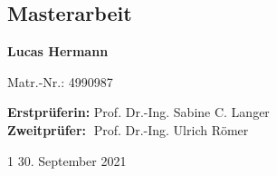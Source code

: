 \documentclass[a4paper,12pt,arial, rgb]{tubsartcl}
\begin{document}
\begin{gausspage}
\begin{segment}[c,bgcolor=tubsWhite]{2}	
\end{segment}
\begin{segment}[c,bgcolor=tubsWhite]{2}	
\end{segment}
\begin{segment}[c,bgcolor=InAGreen,fgcolor=tubsWhite]{3}					\large \noindent
\section*{\textcolor{tubsWhite}{Masterarbeit}} 	
\textbf{Lucas Hermann}

Matr.-Nr.: 4990987



\textbf{Erstprüferin:} Prof. Dr.-Ing. Sabine C. Langer\\
\textbf{Zweitprüfer:}  $\;$Prof. Dr.-Ing. Ulrich Römer
\end{segment}
\begin{segment}[innerpadding=vnone,bgcolor=tubsGreen,%
	fgcolor=tubsWhite]{1} \vskip-3pt \large%
{\small
30. September 2021
}
\end{segment}
\end{gausspage}
\end{document}
